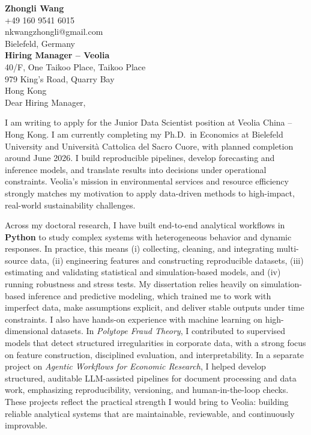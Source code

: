 \documentclass[11pt]{article}
\begin{document}
\noindent
\textbf{Zhongli Wang} \\
+49 160 9541 6015 \\
nkwangzhongli@gmail.com \\
Bielefeld, Germany \\

\noindent
\textbf{Hiring Manager -- Veolia} \\
40/F, One Taikoo Place, Taikoo Place \\
979 King's Road, Quarry Bay \\
Hong Kong \\


\noindent
\noindent Dear Hiring Manager,

I am writing to apply for the Junior Data Scientist position at Veolia China -- Hong Kong.
I am currently completing my Ph.D.\ in Economics at Bielefeld University and Universit\`a Cattolica del Sacro Cuore, with planned completion around June 2026.
I build reproducible pipelines, develop forecasting and inference models, and translate results into decisions under operational constraints.
Veolia's mission in environmental services and resource efficiency strongly matches my motivation to apply data-driven methods to high-impact, real-world sustainability challenges.

Across my doctoral research, I have built end-to-end analytical workflows in \textbf{Python} to study complex systems with heterogeneous behavior and dynamic responses. In practice, this means (i) collecting, cleaning, and integrating multi-source data, (ii) engineering features and constructing reproducible datasets, (iii) estimating and validating statistical and simulation-based models, and (iv) running robustness and stress tests. My dissertation relies heavily on simulation-based inference and predictive modeling, which trained me to work with imperfect data, make assumptions explicit, and deliver stable outputs under time constraints.
I also have hands-on experience with machine learning on high-dimensional datasets. In \textit{Polytope Fraud Theory}, I contributed to supervised models that detect structured irregularities in corporate data, with a strong focus on feature construction, disciplined evaluation, and interpretability. In a separate project on \textit{Agentic Workflows for Economic Research}, I helped develop structured, auditable LLM-assisted pipelines for document processing and data work, emphasizing reproducibility, versioning, and human-in-the-loop checks. These projects reflect the practical strength I would bring to Veolia: building reliable analytical systems that are maintainable, reviewable, and continuously improvable.%
\end{document}
